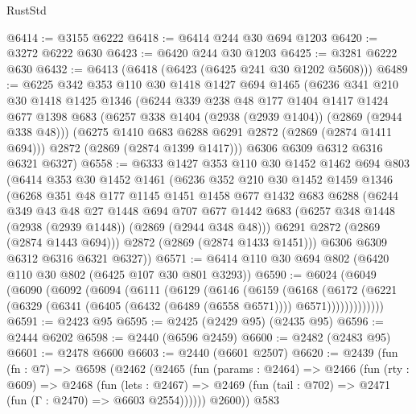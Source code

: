 \begin{lexlean}{RustStd}
\begin{coremodule}
{\begin{coremodule}
{{{{{{{{{{{{@6414 := @3155 @6222
@6418 := @6414 @244 @30 @694 @1203
@6420 := @3272 @6222 @630
@6423 := @6420 @244 @30 @1203
@6425 := @3281 @6222 @630
@6432 := @6413 (@6418 (@6423 (@6425 @241 @30 @1202 @5608)))
@6489 := @6225
    @342
    @353
    @110
    @30
    @1418
    @1427
    @694
    @1465
    (@6236
      @341
      @210
      @30
      @1418
      @1425
      @1346
      (@6244
        @339
        @238
        @48
        @177
        @1404
        @1417
        @1424
        @677
        @1398
        @683
        (@6257 @338 @1404 (@2938 (@2939 @1404)) (@2869 (@2944 @338 @48)))
        (@6275 @1410 @683 @6288 @6291 @2872 (@2869 (@2874 @1411 @694)))
        @2872
        (@2869 (@2874 @1399 @1417)))
      @6306
      @6309
      @6312
      @6316
      @6321
      @6327)
@6558 := @6333
    @1427
    @353
    @110
    @30
    @1452
    @1462
    @694
    @803
    (@6414
      @353
      @30
      @1452
      @1461
      (@6236
        @352
        @210
        @30
        @1452
        @1459
        @1346
        (@6268
          @351
          @48
          @177
          @1145
          @1451
          @1458
          @677
          @1432
          @683
          @6288
          (@6244
            @349
            @43
            @48
            @27
            @1448
            @694
            @707
            @677
            @1442
            @683
            (@6257 @348 @1448 (@2938 (@2939 @1448)) (@2869 (@2944 @348 @48)))
            @6291
            @2872
            (@2869 (@2874 @1443 @694)))
          @2872
          (@2869 (@2874 @1433 @1451)))
        @6306
        @6309
        @6312
        @6316
        @6321
        @6327))
@6571 := @6414 @110 @30 @694 @802 (@6420 @110 @30 @802 (@6425 @107 @30 @801 @3293))
@6590 := @6024
    (@6049
      (@6090
        (@6092
          (@6094
            (@6111
              (@6129
                (@6146
                  (@6159
                    (@6168
                      (@6172
                        (@6221
                          (@6329 (@6341 (@6405 (@6432 (@6489 (@6558 @6571)))) @6571)))))))))))))
@6591 := @2423 @95
@6595 := @2425 (@2429 @95) (@2435 @95)
@6596 := @2444 @6202
@6598 := @2440 (@6596 @2459)
@6600 := @2482 (@2483 @95)
@6601 := @2478 @6600
@6603 := @2440 (@6601 @2507)
@6620 := @2439
    (fun (fn : @7) =>
    @6598
      (@2462
        (@2465
          (fun (params : @2464) =>
          @2466
            (fun (rty : @609) =>
            @2468
              (fun (lets : @2467) =>
              @2469 (fun (tail : @702) => @2471 (fun (Γ : @2470) => @6603 @2554))))))
        @2600))
    @583
}}}}}}}}}}}}
\end{coremodule}}
\end{coremodule}
\end{lexlean}
